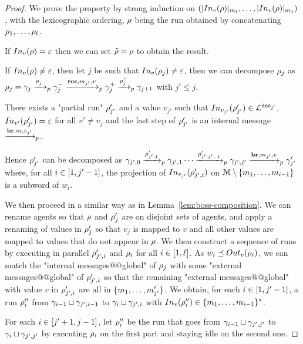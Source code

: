 \begin{proof}
	
	We prove the property by strong induction on $(\size{\vinput{v}{\run}}_{m_\ell}, \ldots, \size{\vinput{v}{\run}}_{m_1})$, with the lexicographic ordering, $\rho$ being the run obtained by concatenating $\rho_1, \ldots, \rho_\ell$.
	
	If $\vinput{v}{\run} = \epsilon$ then we can set $\Tilde{\rho} = \rho$ to obtain the result.
	
	If $\vinput{v}{\run} \neq \epsilon$, then let $j$ be such that $\vinput{v}{\run_j} \neq \epsilon$, then we can decompose $\rho_j$ as $\rho_j = \gamma_{j} \xrightarrow{\rho_j^-}_{p} \gamma_j^- \xrightarrow{\textbf{rec}, m_{j'}, v}_{p} \gamma_j^+ \xrightarrow{\rho_j^+}_{p} \gamma_{j+1}$ with $j'\leq j$. 
	
	There exists a "partial run" $\rho'_{j'}$ and a value $v_{j'}$ such that $\vinput{v_{j'}}{\run'_{j'}} \in \langdec{\decsymb_{j'}}$,  $\vinput{v'}{\run'_{j'}} = \varepsilon$ for all $v' \neq v_j$  and the last step of $\rho'_{j'}$ is an internal message $\xrightarrow{\textbf{br}, m, v_{j'}}_{p}$.
	
	Hence $\rho'_{j'}$ can be decomposed as $\gamma_{{j'},0} \xrightarrow{\rho_{{j'},1}'}_{p} \gamma_{{j'},1} \cdots \xrightarrow{\rho_{{j'},j'-1}'}_{p} \gamma_{{j'},j'} \xrightarrow{\textbf{br}, m_{j'}, v}_{p} \gamma'_{j'}$ where, for all $i \in [1,j'-1]$, the projection of $\vinput{v_{j'}}{\run_{{j'},i}'}$ on ${\mathcal{M}\setminus\{m_1, \ldots, m_{{i}-1}\}}$ is a subword of $w_i$.
	
	We then proceed in a similar way as in Lemma~\ref{lem:boss-composition}.
	We can rename agents so that $\rho$ and $\rho'_j$ are on disjoint sets of agents, and apply a renaming of values in $\rho_j'$ so that $v_j$ is mapped to $v$ and all other values are mapped to values that do not appear in $\rho$.
	We then construct a sequence of runs by executing in parallel $\rho_{j',i}'$ and $\rho_i$ for all $i\in[1,\ell]$. As $w_i \subword \voutput{v}{\run_i}$, we can match the "internal messages@@global" of $\rho_j$ with some "external messages@@global" of $\rho'_{j',i}$ so that the remaining "external messages@@global" with value $v$ in $\rho'_{j',i}$ are all in $\{m_1, \ldots, m'_{j'}\}$. 
	We obtain, for each $i \in [1,j'-1]$, a run $\rho''_i$ from $\gamma_{i-1} \sqcup \gamma_{j', i-1}$ to $\gamma_{i} \sqcup \gamma_{j', i}$ with $\vinput{v}{\run''_i} \in \set{m_1, \ldots, m_{i-1}}^*$. 
	
	For each $i \in [j'+1,j-1]$, let $\rho''_i$ be the run that goes from $\gamma_{i-1} \sqcup \gamma_{j', j'}$ to $\gamma_{i} \sqcup \gamma_{j', j'}$ by executing $\rho_i$ on the first part and staying idle on the second one.
	

\end{proof}
